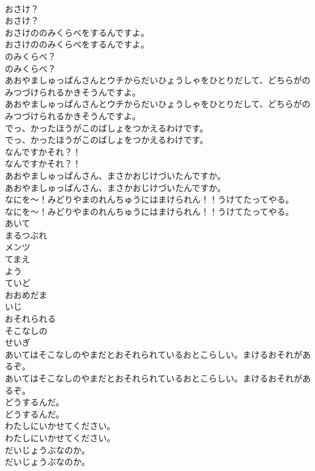 \documentclass[8pt]{extreport}
\begin{document}
\begin{CJK}{UTF8}{min}
\\	おさけ？	
\\	おさけ？ 
\\	おさけののみくらべをするんですよ。	
\\	おさけののみくらべをするんですよ。 
\\	のみくらべ？	
\\	のみくらべ？ 
\\	あおやましゅっぱんさんとウチからだいひょうしゃをひとりだして、どちらがのみつづけられるかきそうんですよ。	
\\	あおやましゅっぱんさんとウチからだいひょうしゃをひとりだして、どちらがのみつづけられるかきそうんですよ。 
\\	でっ、かったほうがこのばしょをつかえるわけです。	
\\	でっ、かったほうがこのばしょをつかえるわけです。 
\\	なんですかそれ？！	
\\	なんですかそれ？！ 
\\	あおやましゅっぱんさん、まさかおじけづいたんですか。	
\\	あおやましゅっぱんさん、まさかおじけづいたんですか。 
\\	なにを〜！みどりやまのれんちゅうにはまけられん！！うけてたってやる。	
\\	なにを〜！みどりやまのれんちゅうにはまけられん！！うけてたってやる。 
\\	あいて
\\	まるつぶれ
\\	メンツ
\\	てまえ
\\	よう
\\	ていど
\\	おおめだま
\\	いじ
\\	おそれられる
\\	そこなしの
\\	せいぎ
\\	あいてはそこなしのやまだとおそれられているおとこらしい。まけるおそれがあるぞ。	
\\	あいてはそこなしのやまだとおそれられているおとこらしい。まけるおそれがあるぞ。 
\\	どうするんだ。	
\\	どうするんだ。 
\\	わたしにいかせてください。	
\\	わたしにいかせてください。 
\\	だいじょうぶなのか。	
\\	だいじょうぶなのか。 

\end{CJK}
\end{document}
